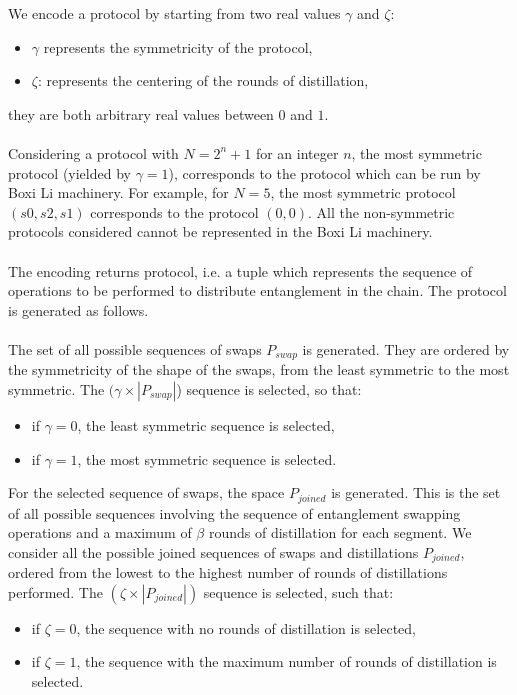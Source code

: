 \documentclass{article}
\begin{document}
We encode a protocol by starting from two real values $\gamma$ and $\zeta$:
\begin{itemize}
    \item \(\gamma\) represents the symmetricity of the protocol,
    \item \(\zeta\): represents the centering of the rounds of distillation,
\end{itemize}
they are both arbitrary real values between $0$ and $1$.
\\\\
Considering a protocol with $N=2^n+1$ for an integer $n$, the most symmetric protocol (yielded by \(\gamma=1\)), corresponds to the protocol which can be run by Boxi Li machinery.
For example, for $N=5$, the most symmetric protocol $(s0, s2, s1)$ corresponds to the protocol $(0,0)$.
All the non-symmetric protocols considered cannot be represented in the Boxi Li machinery.
\\\\
The encoding returns protocol, i.e. a tuple which represents the sequence of operations to be performed to distribute entanglement in the chain. The protocol is generated as follows.
\\\\
The set of all possible sequences of swaps $P_{swap}$ is generated. 
They are ordered by the symmetricity of the shape of the swaps, from the least symmetric to the most symmetric. The \((\gamma \times |P_{swap}|\)) sequence is selected, so that:
\begin{itemize}
    \item if \(\gamma = 0\), the least symmetric sequence is selected,
    \item if \(\gamma = 1\), the most symmetric sequence is selected.
\end{itemize}
For the selected sequence of swaps, the space $P_{joined}$ is generated. This is the set of all possible sequences involving the sequence of entanglement swapping operations and a maximum of $\beta$ rounds of distillation for each segment.
We consider all the possible joined sequences of swaps and distillations $P_{joined}$, ordered from the lowest to the highest  number of rounds of distillations performed. 
The \((\zeta \times |P_{joined}|)\) sequence is selected, such that:
\begin{itemize}
    \item if \(\zeta = 0\), the sequence with no rounds of distillation is selected,
    \item if \(\zeta = 1\), the sequence with the maximum number of rounds of distillation is selected.
\end{itemize}
\end{document}
